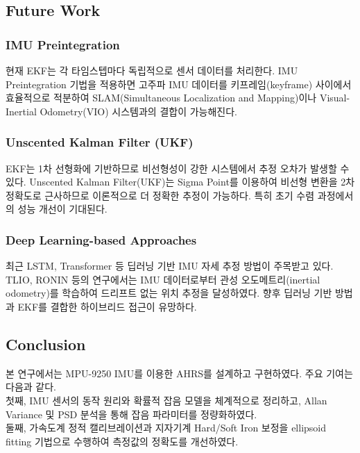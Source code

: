     \subsection{Future Work}
        \subsubsection{IMU Preintegration}
            현재 EKF는 각 타임스텝마다 독립적으로 센서 데이터를 처리한다. IMU Preintegration 기법을 적용하면 고주파 IMU 데이터를 키프레임(keyframe) 사이에서 효율적으로 적분하여 SLAM(Simultaneous Localization and Mapping)이나 Visual-Inertial Odometry(VIO) 시스템과의 결합이 가능해진다.\\

        \subsubsection{Unscented Kalman Filter (UKF)}
            EKF는 1차 선형화에 기반하므로 비선형성이 강한 시스템에서 추정 오차가 발생할 수 있다. Unscented Kalman Filter(UKF)는 Sigma Point를 이용하여 비선형 변환을 2차 정확도로 근사하므로 이론적으로 더 정확한 추정이 가능하다. 특히 초기 수렴 과정에서의 성능 개선이 기대된다.\\

        \subsubsection{Deep Learning-based Approaches}
            최근 LSTM, Transformer 등 딥러닝 기반 IMU 자세 추정 방법이 주목받고 있다. TLIO, RONIN 등의 연구에서는 IMU 데이터로부터 관성 오도메트리(inertial odometry)를 학습하여 드리프트 없는 위치 추정을 달성하였다. 향후 딥러닝 기반 방법과 EKF를 결합한 하이브리드 접근이 유망하다.\\

    \subsection{Conclusion}
        본 연구에서는 MPU-9250 IMU를 이용한 AHRS를 설계하고 구현하였다. 주요 기여는 다음과 같다.\\

        첫째, IMU 센서의 동작 원리와 확률적 잡음 모델을 체계적으로 정리하고, Allan Variance 및 PSD 분석을 통해 잡음 파라미터를 정량화하였다.\\

        둘째, 가속도계 정적 캘리브레이션과 지자기계 Hard/Soft Iron 보정을 ellipsoid fitting 기법으로 수행하여 측정값의 정확도를 개선하였다.\\

